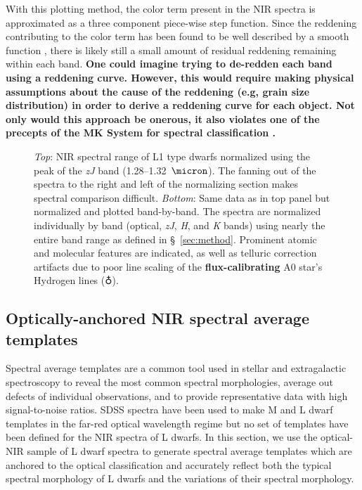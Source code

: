 \documentclass[12pt]{aastex6}
\begin{document}
With this plotting method, the color term present in the NIR spectra is approximated as a three component piece-wise step function.
Since the reddening contributing to the color term has been found to be well described by a smooth function \citep{Marocco:2014kr,Hiranaka:2016jm}, there is likely still a small amount of residual reddening remaining within each band.
\textbf{One could imagine trying to de-redden each band using a reddening curve.
However, this would require making physical assumptions about the cause of the reddening (e.g, grain size distribution) in order to derive a reddening curve for each object.
Not only would this approach be onerous, it also violates one of the precepts of the MK System for spectral classification \citep{Morgan:1984wy,Cushing:2014un}.}

\begin{figure}
  \caption{\emph{Top}: NIR spectral range of L1 type dwarfs normalized using the peak of the \emph{zJ} band (1.28--1.32~$\micron$). The fanning out of the spectra to the right and left of the normalizing section makes spectral comparison difficult.
    \emph{Bottom}: Same data as in top panel but normalized and plotted band-by-band. The spectra are normalized individually by band (optical, \emph{zJ}, \emph{H}, and \emph{K} bands) using nearly the entire band range as defined in \S~\ref{sec:method}. Prominent atomic and molecular features are indicated, as well as telluric correction artifacts due to poor line scaling of the \textbf{ flux-calibrating} A0 star's Hydrogen lines ($\earth$).}
  \label{fig:L1fan}
\end{figure}

\subsection{Optically-anchored NIR spectral average templates}
\label{sec:templates}

Spectral average templates are a common tool used in stellar and extragalactic spectroscopy to reveal the most common spectral morphologies, average out defects of individual observations, and to provide representative data with high signal-to-noise ratios.
SDSS spectra have been used to make M and L dwarf templates in the far-red optical wavelength regime \citep{Bochanski07_templates, Schmidt:2014jc} but no set of templates have been defined for the NIR spectra of L dwarfs.
In this section, we use the optical-NIR sample of L dwarf spectra to generate spectral average templates which are anchored to the optical classification and accurately reflect both the typical spectral morphology of L dwarfs and the variations of their spectral morphology.
\end{document}
